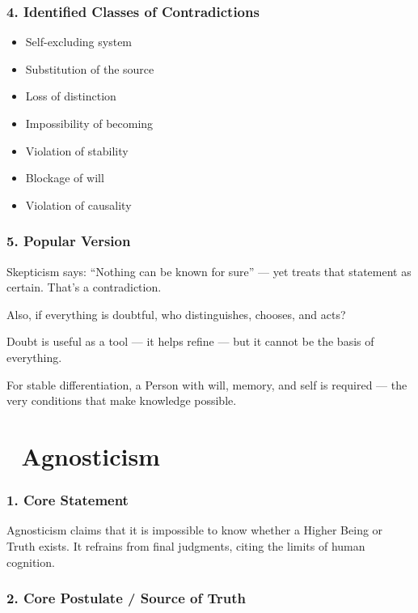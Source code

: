 \documentclass[12pt]{article}
\begin{document}
\subsubsection*{4. Identified Classes of Contradictions}

\begin{itemize}
\item Self-excluding system
\item Substitution of the source
\item Loss of distinction
\item Impossibility of becoming
\item Violation of stability
\item Blockage of will
\item Violation of causality
\end{itemize}

\subsubsection*{5. Popular Version}

Skepticism says: ``Nothing can be known for sure'' — yet treats that statement as certain. That’s a contradiction.

Also, if everything is doubtful, who distinguishes, chooses, and acts?

Doubt is useful as a tool — it helps refine — but it cannot be the basis of everything.

For stable differentiation, a Person with will, memory, and self is required — the very conditions that make knowledge possible.

\section*{🔷 Agnosticism}

\subsubsection*{1. Core Statement}

Agnosticism claims that it is impossible to know whether a Higher Being or Truth exists. It refrains from final judgments, citing the limits of human cognition.

\subsubsection*{2. Core Postulate / Source of Truth}
\end{document}
